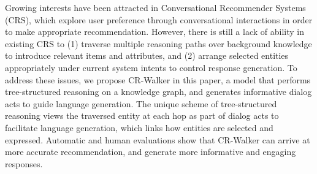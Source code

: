 Growing interests have been attracted in Conversational Recommender Systems (CRS), which explore user preference through conversational interactions in order to make appropriate recommendation. However, there is still a lack of ability in existing CRS to (1) traverse multiple reasoning paths over background knowledge to introduce relevant items and attributes, and (2) arrange selected entities appropriately under current system intents to control response generation. To address these issues, we propose CR-Walker in this paper, a model that performs tree-structured reasoning on a knowledge graph, and generates informative dialog acts to guide language generation. The unique scheme of tree-structured reasoning views the traversed entity at each hop as part of dialog acts to facilitate language generation, which links how entities are selected and expressed.  Automatic and human evaluations show that CR-Walker can arrive at more accurate recommendation, and generate more informative and engaging responses.
